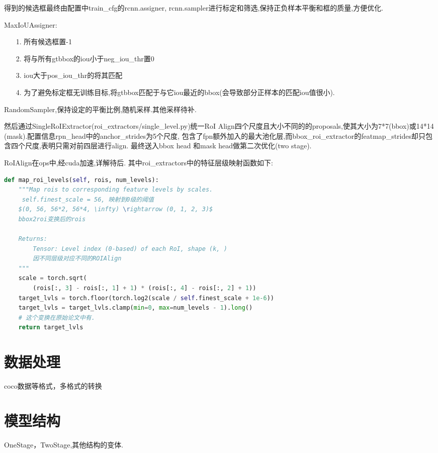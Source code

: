 \documentclass[UTF8]{ctexart}
\begin{document}
得到的候选框最终由配置中train\_cfg的rcnn.assigner, rcnn.sampler进行标定和筛选,保持正负样本平衡和框的质量,方便优化.

MaxIoUAssigner:
\begin{adjustwidth}{1cm}{0cm}
\begin{itemize}
	\item[1.] 所有候选框置-1
	\item[2.] 将与所有gtbbox的iou小于neg\_iou\_thr置0
	\item[3.] iou大于pos\_iou\_thr的将其匹配
	\item[4.] 为了避免标定框无训练目标,将gtbbox匹配于与它iou最近的bbox(会导致部分正样本的匹配iou值很小).
\end{itemize}
\end{adjustwidth}

RandomSampler,保持设定的平衡比例,随机采样.其他采样待补.

然后通过SingleRoIExtractor(roi\_extractors/single\_level.py)统一RoI
Align四个尺度且大小不同的的proposals,使其大小为7*7(bbox)或14*14
(mask).配置信息rpn\_head中的anchor\_strides为5个尺度,
包含了fpn额外加入的最大池化层,而bbox\_roi\_extractor的featmap\_strides却只包含四个尺度,表明只需对前四层进行align.
最终送入bbox head 和mask head做第二次优化(two stage).

RoIAlign在ops中,经cuda加速,详解待后.
其中roi\_extractors中的特征层级映射函数如下:
\lstset{style=mystyle}
\begin{lstlisting}[language=Python]
	def map_roi_levels(self, rois, num_levels):
	"""Map rois to corresponding feature levels by scales.
	 self.finest_scale = 56, 映射到0级的阈值
	$(0, 56, 56*2, 56*4, \infty) \rightarrow (0, 1, 2, 3)$
	bbox2roi变换后的rois

	Returns:
		Tensor: Level index (0-based) of each RoI, shape (k, )
		因不同层级对应不同的ROIAlign
	"""
	scale = torch.sqrt(
		(rois[:, 3] - rois[:, 1] + 1) * (rois[:, 4] - rois[:, 2] + 1))
	target_lvls = torch.floor(torch.log2(scale / self.finest_scale + 1e-6))
	target_lvls = target_lvls.clamp(min=0, max=num_levels - 1).long()
	# 这个变换在原始论文中有.
	return target_lvls
\end{lstlisting}

\section{数据处理}
\label{sec:detail}
coco数据等格式，多格式的转换

\section{模型结构}
OneStage，TwoStage,其他结构的变体.
\end{document}
